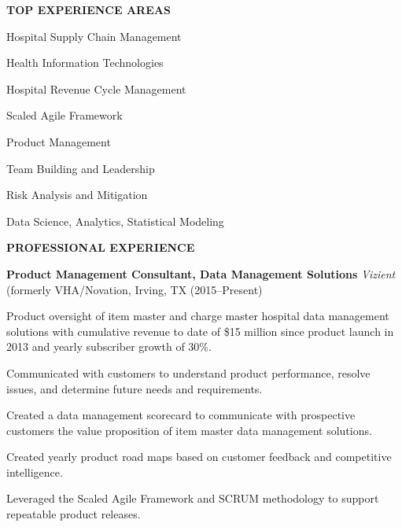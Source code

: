 \documentclass{article}
\newcommand{\sbt}{\,\begin{picture}(-1,1)(-1,-3)\circle*{3}\end{picture}\ }
\newenvironment{tightcenter}{%
  \setlength\topsep{0pt}
  \setlength\parskip{10pt}
  \begin{center}
}{%
  \end{center}
}
\begin{document}
\begin{tightcenter}
{\bfseries \large TOP EXPERIENCE AREAS}
\end{tightcenter}

\begin{minipage}[t]{0.4\textwidth}
\begin{compactitem}
\item[\sbt] Hospital Supply Chain Management
\item[\sbt] Health Information Technologies
\item[\sbt] Hospital Revenue Cycle Management
\item[\sbt] Scaled Agile Framework
\end{compactitem}
\end{minipage}
\begin{minipage}[t]{0.6\textwidth}
\begin{compactitem}
\item[\sbt] Product Management
\item[\sbt] Team Building and Leadership
\item[\sbt] Risk Analysis and Mitigation
\item[\sbt] Data Science, Analytics, Statistical Modeling

\end{compactitem}
\end{minipage}

\begin{tightcenter}
{\bfseries \large PROFESSIONAL EXPERIENCE}
\end{tightcenter}

\noindent
{\bfseries Product Management Consultant, Data Management Solutions} {\itshape Vizient} (formerly VHA/Novation, Irving, TX (2015--Present)

\begin{compactitem}

\item[\sbt] Product oversight of item master and charge master hospital data management solutions with cumulative revenue to date of \$15 million since product launch in 2013 and yearly subscriber growth of 30\%.
\item[\sbt] Communicated with customers to understand product performance, resolve issues, and determine future needs and requirements.
\item[\sbt] Created a data management scorecard to communicate with prospective customers the value proposition of item master data management solutions.
\item[\sbt] Created yearly product road maps based on customer feedback and competitive intelligence.
\item[\sbt] Leveraged the Scaled Agile Framework and SCRUM methodology to support repeatable product releases.

\end{compactitem}
\end{document}

